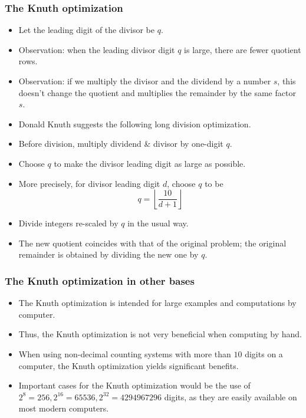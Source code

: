 \begin{frame}
\frametitle{The Knuth optimization}
\begin{itemize}
\item Let the leading digit of the divisor be $q$.
\item Observation: when the leading divisor digit $q$ is large, there are fewer quotient rows. 
\item Observation: if we multiply the divisor and the dividend by a number $s$, this doesn't change the quotient and multiplies the remainder by the same factor $s$.
\item Donald Knuth suggests the following long division optimization. 
\item Before division, multiply dividend \& divisor by one-digit $q$. 
\item Choose $q$ to make the divisor leading digit as large as possible. 
\item More precisely, for divisor leading digit $d$, choose $q$ to be 
\[
q = \left\lfloor\frac{10}{d + 1}\right\rfloor
\]
\item Divide integers re-scaled by $q$ in the usual way. 
\item The new quotient coincides with that of the original problem; the original remainder is obtained by dividing the new one by $q$.
\end{itemize}
\end{frame}

\begin{frame}
\frametitle{The Knuth optimization in other bases}
\begin{itemize}
\item The Knuth optimization is intended for large examples and computations by computer. 
\item Thus, the Knuth optimization is not very beneficial when computing by hand.
\item When using non-decimal counting systems with more than $10$ digits on a computer, the Knuth optimization yields significant benefits. 
\item Important cases for the Knuth optimization would be the use of $2^8 = 256, 2^{16}= 65536, 2^{32}=4294967296 $ digits, as they are easily available on most modern computers.
\end{itemize}
\end{frame}
